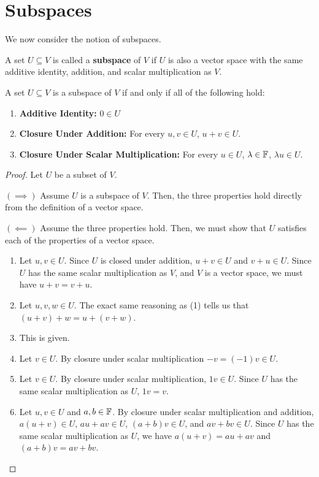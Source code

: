 \section{Subspaces}
We now consider the notion of subspaces.
\begin{definition}[Subspace]
    A set $U\subseteq V$ is called a \textbf{subspace} of $V$ if $U$ is also a vector space with the same additive identity, addition, and scalar multiplication as $V$.
\end{definition}
\begin{theorem}
    A set $U\subseteq V$ is a subspace of $V$ if and only if all of the following hold:
    \begin{enumerate}
        \item \textbf{Additive Identity:} $0\in U$
        \item \textbf{Closure Under Addition:} For every $u,v\in U$, $u+v\in U$.
        \item \textbf{Closure Under Scalar Multiplication:} For every $u\in U$, $\lambda \in \mathbb F$, $\lambda u \in U$.
    \end{enumerate}
\end{theorem}
\begin{proof}
    Let $U$ be a subset of $V$.
    
    $(\implies)$ Assume $U$ is a subspace of $V$. Then, the three properties hold directly from the definition of a vector space.

    $(\impliedby)$ Assume the three properties hold. Then, we must show that $U$ satisfies each of the properties of a vector space.
    \begin{enumerate}
        \item Let $u,v\in U$. Since $U$ is closed under addition, $u+v\in U$ and $v+u\in U$. Since $U$ has the same scalar multiplication as $V$, and $V$ is a vector space, we must have $u+v=v+u$.
        \item Let $u,v,w\in U$. The exact same reasoning as (1) tells us that $(u+v)+w = u + (v+w)$.
        \item This is given.
        \item Let $v\in U$. By closure under scalar multiplication $-v = (-1)v\in U$.
        \item Let $v\in U$. By closure under scalar multiplication, $1v \in U$. Since $U$ has the same scalar multiplication as $U$, $1v = v$.
        \item Let $u,v\in U$ and $a,b\in \mathbb F$. By closure under scalar multiplication and addition, $a(u+v) \in U$, $au+av\in U$, $(a+b)v \in U$, and $av+bv \in U$. Since $U$ has the same scalar multiplication as $U$, we have $a(u+v) = au+av$ and $(a+b)v = av+bv$.
    \end{enumerate}
\end{proof}
